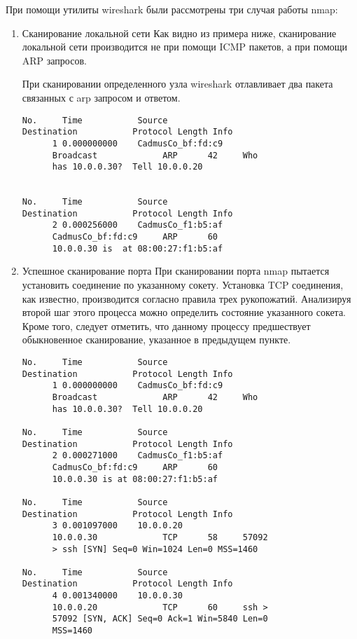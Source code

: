 \documentclass{article}
\begin{document}
При помощи утилиты wireshark были рассмотрены три случая работы nmap:

\begin{enumerate}
\item Сканирование локальной сети
Как видно из примера ниже, сканирование локальной сети производится не при помощи ICMP пакетов, а при помощи ARP запросов.

При сканировании определенного узла wireshark отлавливает два пакета связанных с arp запросом и ответом.
\begin{verbatim}
No.     Time           Source                
Destination           Protocol Length Info
      1 0.000000000    CadmusCo_bf:fd:c9     
      Broadcast             ARP      42     Who 
      has 10.0.0.30?  Tell 10.0.0.20
      
      
No.     Time           Source                
Destination           Protocol Length Info
      2 0.000256000    CadmusCo_f1:b5:af     
      CadmusCo_bf:fd:c9     ARP      60     
      10.0.0.30 is  at 08:00:27:f1:b5:af
\end{verbatim}

\item Успешное сканирование порта
При сканировании порта nmap пытается установить соединение по указанному сокету. Установка TCP соединения, как известно, производится согласно правила трех рукопожатий. Анализируя второй шаг этого процесса можно определить состояние указанного сокета. Кроме того, следует отметить, что данному процессу предшествует обыкновенное сканирование, указанное в предыдущем пункте.

\begin{verbatim}
No.     Time           Source                
Destination           Protocol Length Info
      1 0.000000000    CadmusCo_bf:fd:c9     
      Broadcast             ARP      42     Who 
      has 10.0.0.30?  Tell 10.0.0.20
      
No.     Time           Source                
Destination           Protocol Length Info
      2 0.000271000    CadmusCo_f1:b5:af     
      CadmusCo_bf:fd:c9     ARP      60     
      10.0.0.30 is at 08:00:27:f1:b5:af
      
No.     Time           Source                
Destination           Protocol Length Info
      3 0.001097000    10.0.0.20             
      10.0.0.30             TCP      58     57092 
      > ssh [SYN] Seq=0 Win=1024 Len=0 MSS=1460

No.     Time           Source                
Destination           Protocol Length Info
      4 0.001340000    10.0.0.30             
      10.0.0.20             TCP      60     ssh > 
      57092 [SYN, ACK] Seq=0 Ack=1 Win=5840 Len=0 
      MSS=1460


\end{verbatim}
\end{enumerate}
\end{document}
